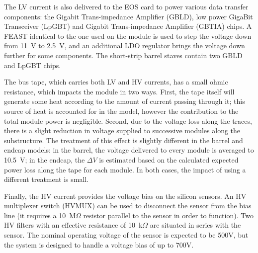 The LV current is also delivered to the EOS card to power various data transfer components:
the Gigabit Trans-impedance Amplifier (GBLD), low power GigaBit Transceiver (LpGBT) and Gigabit Trans-impedance Amplifier (GBTIA) chips.
A FEAST identical to the one used on the module is used to step the
voltage down from 11~V to 2.5~V, and an additional LDO regulator brings the voltage down further for some components.
The short-strip barrel staves contain two GBLD and LpGBT chips.

The bus tape, which carries both LV and HV currents, has a small ohmic resistance, which impacts the
module in two ways. First,
the tape itself will generate some heat according to the amount of current passing through it; this
source of heat is accounted for in the model, however the contribution to the total module power
is negligible.
Second, due to the voltage loss along the traces, there is a slight reduction in voltage supplied to successive modules along the substructure.
The treatment of this effect is slightly different in the barrel and
endcap models: in the barrel, the voltage delivered to every module is averaged to 10.5~V; in the endcap,
the $\Delta V$ is estimated based on the calculated expected power loss along the tape for each module.
In both cases, the impact of using a different treatment is small.

Finally, the HV current provides the voltage bias on the silicon sensors. An HV multiplexer
switch (HVMUX) can be used to disconnect the sensor from the
bias line (it requires a 10~M$\Omega$ resistor parallel to the sensor in order to function). Two HV filters with an effective resistance of 10~k$\Omega$ are situated in series with the
sensor. The nominal operating voltage of the sensor is expected to be 500V, but the system is designed
to handle a voltage bias of up to 700V.
